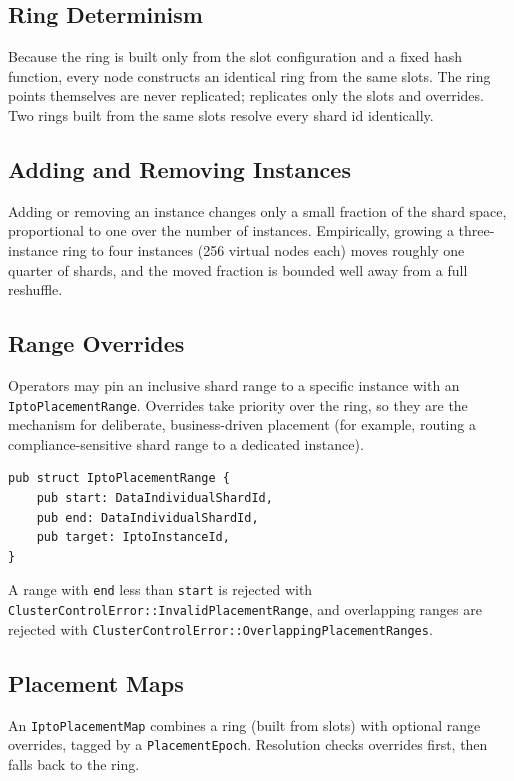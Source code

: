 \subsection{Ring Determinism}

Because the ring is built only from the slot configuration and a fixed hash
function, every node constructs an identical ring from the same slots. The ring
points themselves are never replicated; \raft{} replicates only the slots and
overrides. Two rings built from the same slots resolve every shard id
identically.

\subsection{Adding and Removing Instances}

Adding or removing an \ipto{} instance changes only a small fraction of the
shard space, proportional to one over the number of instances. Empirically,
growing a three-instance ring to four instances (256 virtual nodes each) moves
roughly one quarter of shards, and the moved fraction is bounded well away from
a full reshuffle.

\subsection{Range Overrides}

Operators may pin an inclusive shard range to a specific instance with an
\texttt{IptoPlacementRange}. Overrides take priority over the ring, so they are
the mechanism for deliberate, business-driven placement (for example, routing a
compliance-sensitive shard range to a dedicated instance).

\begin{lstlisting}
pub struct IptoPlacementRange {
    pub start: DataIndividualShardId,
    pub end: DataIndividualShardId,
    pub target: IptoInstanceId,
}
\end{lstlisting}

A range with \texttt{end} less than \texttt{start} is rejected with
\texttt{ClusterControlError::InvalidPlacementRange}, and overlapping ranges are
rejected with \texttt{ClusterControlError::OverlappingPlacementRanges}.

\subsection{Placement Maps}

An \texttt{IptoPlacementMap} combines a ring (built from slots) with optional
range overrides, tagged by a \texttt{PlacementEpoch}. Resolution checks
overrides first, then falls back to the ring.

